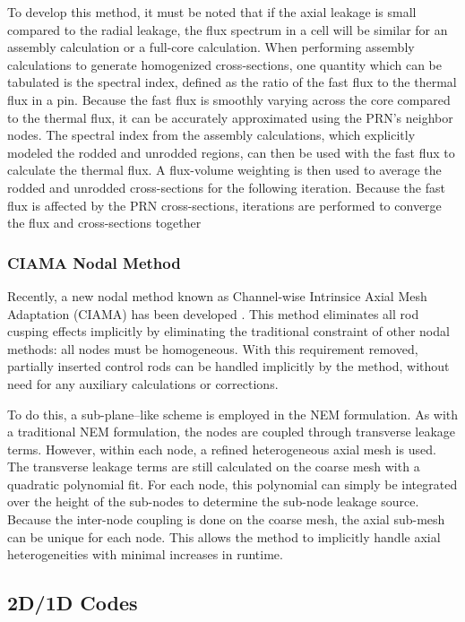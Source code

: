 To develop this method, it must be noted that if the axial leakage is small compared to the radial leakage, the flux spectrum in a cell will be similar for an assembly calculation or a full-core calculation.  When performing assembly calculations to generate homogenized cross-sections, one quantity which can be tabulated is the spectral index, defined as the ratio of the fast flux to the thermal flux in a pin.  Because the fast flux is smoothly varying across the core compared to the thermal flux, it can be accurately approximated using the PRN's neighbor nodes.  The spectral index from the assembly calculations, which explicitly modeled the rodded and unrodded regions, can then be used with the fast flux to calculate the thermal flux.  A flux-volume weighting is then used to average the rodded and unrodded cross-sections for the following iteration.  Because the fast flux is affected by the PRN cross-sections, iterations are performed to converge the flux and cross-sections together

\subsubsection{CIAMA Nodal Method}

Recently, a new nodal method known as Channel-wise Intrinsice Axial Mesh Adaptation (CIAMA) has been developed \cite{yu2015CIAMArodDecusping,lu2015CIAMAintro}.  This method eliminates all rod cusping effects implicitly by eliminating the traditional constraint of other nodal methods: all nodes must be homogeneous.  With this requirement removed, partially inserted control rods can be handled implicitly by the method, without need for any auxiliary calculations or corrections.

To do this, a sub-plane--like scheme is employed in the NEM formulation.  As with a traditional NEM formulation, the nodes are coupled through transverse leakage terms.  However, within each node, a refined heterogeneous axial mesh is used.  The transverse leakage terms are still calculated on the coarse mesh with a quadratic polynomial fit.  For each node, this polynomial can simply be integrated over the height of the sub-nodes to determine the sub-node leakage source.  Because the inter-node coupling is done on the coarse mesh, the axial sub-mesh can be unique for each node.  This allows the method to implicitly handle axial heterogeneities with minimal increases in runtime.

\subsection{2D/1D Codes}\label{ss:2d1d-old-decusping-methods}


